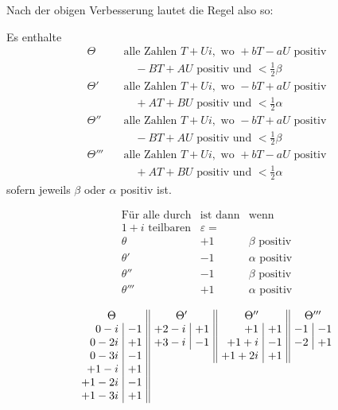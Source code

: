 Nach der obigen Verbesserung lautet die Regel also so:\par
Es enthalte
\[
\begin{aligned}
\Theta\quad&\text{alle Zahlen }T+Ui,\text{ wo }+bT-aU\text{ positiv}\\
&\quad -BT+AU\text{ positiv und }<\tfrac12\beta\\
\Theta'\quad&\text{alle Zahlen }T+Ui,\text{ wo }-bT+aU\text{ positiv}\\
&\quad +AT+BU\text{ positiv und }<\tfrac12\alpha\\
\Theta''\quad&\text{alle Zahlen }T+Ui,\text{ wo }-bT+aU\text{ positiv}\\
&\quad -BT+AU\text{ positiv und }<\tfrac12\beta\\
\Theta'''\quad&\text{alle Zahlen }T+Ui,\text{ wo }+bT-aU\text{ positiv}\\
&\quad +AT+BU\text{ positiv und }<\tfrac12\alpha
\end{aligned}
\]
sofern jeweils $\beta$ oder $\alpha$ positiv ist.

\[
\begin{array}{c|c|l}
\text{Für alle durch}&\text{ist dann}&\text{wenn}\\
1+i\text{ teilbaren}&\varepsilon=&\\
\theta&+1&\beta\text{ positiv}\\
\theta'&-1&\alpha\text{ positiv}\\
\theta''&-1&\beta\text{ positiv}\\
\theta'''&+1&\alpha\text{ positiv}
\end{array}
\]

\[
\setlength{\arraycolsep}{4pt}
\begin{array}{r|r||r|r||r|r||r|r}
\multicolumn{2}{c||}{\Theta}&\multicolumn{2}{c||}{\Theta'}&\multicolumn{2}{c||}{\Theta''}&\multicolumn{2}{c}{\Theta'''}\\
0-i&-1&+2-i&+1&+1&+1&-1&-1\\
0-2i&+1&+3-i&-1&+1+i&-1&-2&+1\\
0-3i&-1&\multicolumn{2}{c||}{}&+1+2i&+1&\multicolumn{2}{c}{}\\
+1-i&+1&\multicolumn{6}{c}{}\\
+1-2i&-1&\multicolumn{6}{c}{}\\
+1-3i&+1&\multicolumn{6}{c}{}
\end{array}
\]

\begin{center}
\resizebox{.86\textwidth}{!}{}
\end{center}
